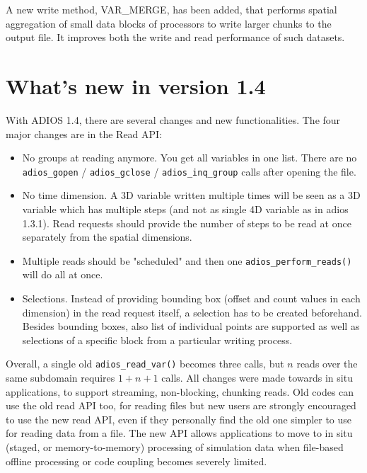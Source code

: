 A new write method, VAR\_MERGE, has been added, that performs spatial aggregation of small data blocks of processors to write larger chunks to the output file. It improves both the write and read performance of such datasets.

\section {What's new in version 1.4}

With ADIOS 1.4, there are several changes and new functionalities. 
The four major changes are in the Read API:

\begin{itemize}
\item No groups at reading anymore. You get all variables in one list.
There are no \verb+adios_gopen+ / \verb+adios_gclose+ / \verb+adios_inq_group+ 
calls after opening the file.
\item No time dimension. A 3D variable written multiple times will be seen as 
a 3D variable which has multiple steps (and not as single 4D variable as in adios 1.3.1).
Read requests should provide the number of steps to be read at once separately from the
spatial dimensions.
\item Multiple reads should be "scheduled" and then one \verb+adios_perform_reads()+ 
will do all at once. 
\item Selections. Instead of providing bounding box (offset and count values
in each dimension) in the read request itself, a selection has to be created 
beforehand. Besides bounding boxes, also list of individual points are supported 
as well as selections of a specific block from a particular writing process.
\end{itemize}

Overall, a single old \verb+adios_read_var()+ becomes three calls, but $n$ reads over the same subdomain requires $1+n+1$ calls.  
All changes were made towards in situ applications, to support streaming, non-blocking, chunking reads. 
Old codes can use the old read API too, for reading files but new users are strongly encouraged to use the new read API, even if they personally find the old one simpler to use for reading data from a file. The new API allows applications to move to in situ (staged, or memory-to-memory) processing of simulation data when file-based offline processing or code coupling becomes severely limited.  

